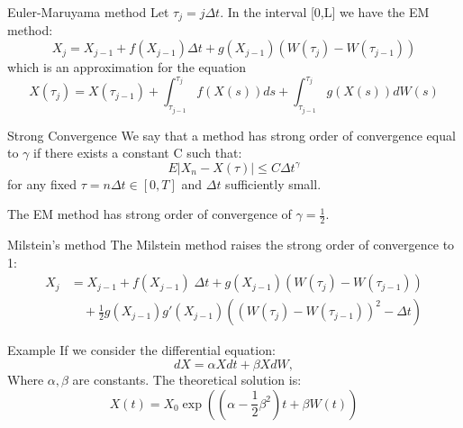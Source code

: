 \begin{frame}{Euler-Maruyama method}
Let $\tau_j=j\Delta t$. In the interval [0,L] we have the EM method:\bigskip\\
$$X_j=X_{j-1}+f(X_{j-1})\Delta t+g(X_{j-1})(W(\tau_j)-W(\tau_{j-1}))$$
 which is an approximation for the equation
$$X(\tau_j)=X(\tau_{j-1})+\int_{\tau_{j-1}}^{\tau_{j}}f(X(s))ds+\int_
{\tau_{j-1}}^{\tau_{j}}g(X(s))dW(s)$$
\end{frame}

\begin{frame}
\begin{block}{Strong Convergence}
We say that a method has strong order of convergence equal to $\gamma$ if there exists a constant C such that:
$$E|X_n-X(\tau)|\leq C \Delta t^\gamma$$
for any fixed $\tau=n \Delta t \in [0,T]$ and $\Delta t$ sufficiently small.
\end{block}
\bigskip
The EM method has strong order of convergence of $\gamma=\frac{1}{2}$\cite{doi:10.1137/S0036144500378302}.
\end{frame}

\begin{frame}{Milstein's method}
The Milstein method raises the strong order of convergence to 1\cite{doi:10.1137/S0036144500378302}:	
	\begin{equation*}
	\begin{split}
	X_{j} & =X_{j-1}+ f(X_{j-1}) \; \Delta t + g(X_{j-1})(W(\tau_j)-W(\tau_{j-1}))\\
	  &\quad +\frac{1}{2}g(X_{j-1})g'(X_{j-1})((W(\tau_j)-W(\tau_{j-1}))^2-\Delta t)
	\end{split}
	\end{equation*}
\end{frame}

\begin{frame}{Example}
If we consider the differential equation:
\begin{equation*}
  dX=\alpha X dt+ \beta X dW,
\end{equation*}
Where $\alpha, \beta$ are constants. The theoretical solution is: 
\begin{equation*}
  X(t)=X_{0}\exp{\left((\alpha -\frac{1}{2}\beta ^2)t +\beta W(t)\right)}
\end{equation*}
\end{frame}

